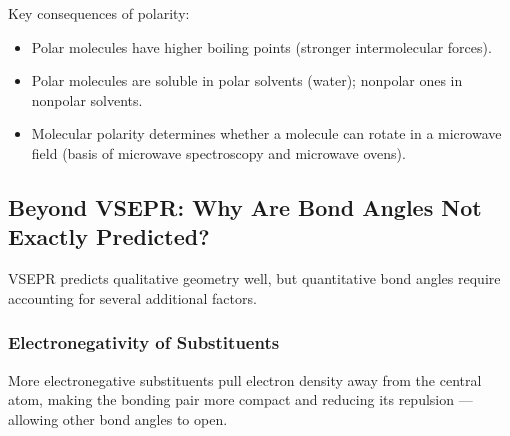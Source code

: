 \documentclass[12pt, a4paper]{book}
\begin{document}
\begin{center}
\end{center}

\vspace{0.4em}

Key consequences of polarity:
\begin{itemize}[nosep, leftmargin=2em]
  \item Polar molecules have higher boiling points
        (stronger intermolecular forces).
  \item Polar molecules are soluble in polar solvents
        (water); nonpolar ones in nonpolar solvents.
  \item Molecular polarity determines whether a molecule
        can rotate in a microwave field (basis of
        microwave spectroscopy and microwave ovens).
\end{itemize}

\subsection{Beyond VSEPR: Why Are Bond Angles Not Exactly Predicted?}

VSEPR predicts qualitative geometry well, but quantitative
bond angles require accounting for several additional factors.

\subsubsection{Electronegativity of Substituents}

More electronegative substituents pull electron density
away from the central atom, making the bonding pair
more compact and reducing its repulsion --- allowing
other bond angles to open.
\end{document}
